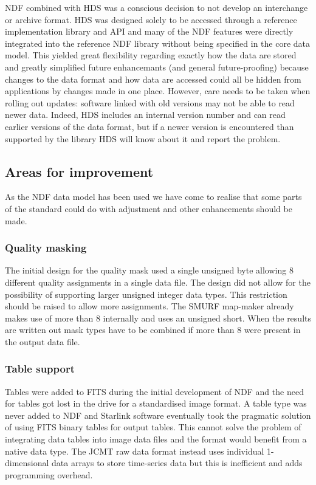 \documentclass[final,authoryear,5p,times,twocolumn]{elsarticle}
\begin{document}
NDF combined with HDS was a conscious decision to not develop an
interchange or archive format. HDS was designed solely to be accessed
through a reference implementation library and API and many of the NDF
features were directly integrated into the reference NDF library without being
specified in the core data model.  This yielded great flexibility
regarding exactly how the data are stored and greatly simplified
future enhancemants (and general future-proofing) because changes to
the data format and how data are accessed could all be hidden from
applications by changes made in one place. However, care needs to be taken
when rolling out updates: software linked with old versions
may not be able to read newer data. Indeed, HDS includes an internal
version number and can read earlier versions of the data format, but if a
newer version is encountered than supported by the library HDS will
know about it and report the problem.

\subsection{Areas for improvement}

As the NDF data model has been used we have come to realise that some
parts of the standard could do with adjustment and other enhancements
should be made.

\subsubsection{Quality masking}

The initial design for the quality mask used a single unsigned byte
allowing 8 different quality assignments in a single data file. The
design did not allow for the possibility of supporting larger unsigned
integer data types. This restriction should be raised to allow more
assignments. The SMURF map-maker
\citep[][]{2013MNRAS.430.2545C} already makes use of more
than 8 internally and uses an unsigned short. When the results are
written out mask types have to be combined if more than 8 were present
in the output data file.

\subsubsection{Table support}

Tables were added to FITS \citep{1988A&AS...73..365H} during the
initial development of NDF and the need for tables got lost in the
drive for a standardised image format. A table type was never added to
NDF and Starlink software eventually took the pragmatic solution of
using FITS binary tables \citep{1995A&AS..113..159C} for output
tables. This cannot solve the problem of integrating data tables into
image data files and the format would benefit from a native data
type. The JCMT raw data format instead uses individual 1-dimensional
data arrays to store time-series data but this is inefficient and adds
programming overhead.
\end{document}
